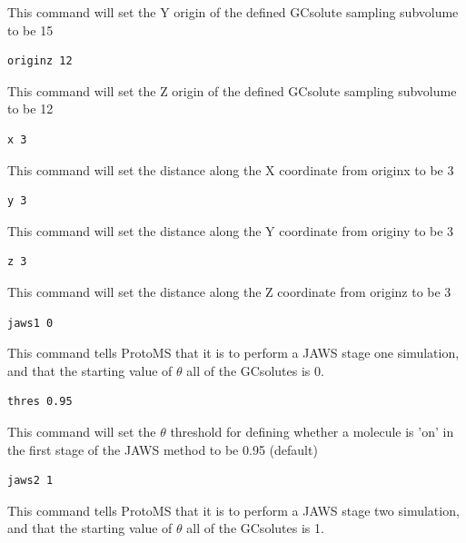 \documentclass[letterpaper,10pt,english]{sphinxmanual}
\begin{document}
This command will set the Y origin of the defined GCsolute sampling subvolume to be 15

\begin{Verbatim}[commandchars=\\\{\}]
originz 12
\end{Verbatim}

This command will set the Z origin of the defined GCsolute sampling subvolume to be 12

\begin{Verbatim}[commandchars=\\\{\}]
x 3
\end{Verbatim}

This command will set the distance along the X coordinate from originx to be 3

\begin{Verbatim}[commandchars=\\\{\}]
y 3
\end{Verbatim}

This command will set the distance along the Y coordinate from originy to be 3

\begin{Verbatim}[commandchars=\\\{\}]
z 3
\end{Verbatim}

This command will set the distance along the Z coordinate from originz to be 3

\begin{Verbatim}[commandchars=\\\{\}]
jaws1 0
\end{Verbatim}

This command tells ProtoMS that it is to perform a JAWS stage one simulation, and that the starting value of \(\theta\) all of the GCsolutes is 0.

\begin{Verbatim}[commandchars=\\\{\}]
thres 0.95
\end{Verbatim}

This command will set the \(\theta\) threshold for defining whether a molecule is ’on’ in the first stage of the JAWS method to be 0.95 (default)

\begin{Verbatim}[commandchars=\\\{\}]
jaws2 1
\end{Verbatim}

This command tells ProtoMS that it is to perform a JAWS stage two simulation, and that the starting value of \(\theta\) all of the GCsolutes is 1.
\end{document}
